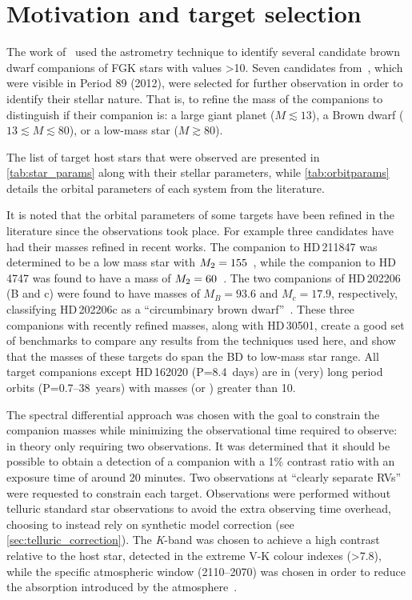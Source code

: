 
\section{Motivation and target selection}
\label{sec:target_motivation}

The work of~\citet{sahlmann_search_2011} used the astrometry technique to identify several candidate brown dwarf companions of {FGK} stars with \Mtwosini{} values >10\Mjup{}.
Seven candidates from~\citet{sahlmann_search_2011}, which were visible in {Period 89} (2012), were selected for further observation in order to identify their stellar nature.
That is, to refine the mass of the companions to distinguish if their companion is: a large giant planet (\(M \apprle 13\)\Mjup{}), a Brown dwarf (\(13 \apprle M \apprle 80\)\Mjup{}), or a low-mass star (\(M \apprge 80\)\Mjup).

The list of target host stars that were observed are presented in \cref{tab:star_params} along with their stellar parameters, while \cref{tab:orbitparams} details the orbital parameters of each system from the literature.

It is noted that the orbital parameters of some targets have been refined in the literature since the observations took place.
For example three candidates have had their masses refined in recent works.
The companion to {HD\,211847} was determined to be a low mass star with \({M}_{2}=155\)\Mjup{}~\citep{moutou_eccentricity_2017}, while the companion to {HD\,4747} was found to have a mass of \({M}_{2}=60\)\Mjup{}~\citep{crepp_trends_2016}.
The two companions of {HD\,202206} (B and c) were found to have masses of \({M}_{B}=93.6\)\Mjup{} and \({M}_{c}=17.9\)\Mjup{}, respectively, classifying {HD\,202206}c as a ``circumbinary brown dwarf''~\citep{benedict_hd_2017}.
These three companions with recently refined masses, along with {HD\,30501}, create a good set of benchmarks to compare any results from the techniques used here, and show that the masses of these targets do span the {BD} to low-mass star range.
All target companions except {HD\,162020} (P=8.4~days) are in (very) long period orbits (P=0.7--38~years) with masses (or \Mtwosini{}) greater than 10\Mjup{}.

The spectral differential approach was chosen with the goal to constrain the companion masses while minimizing the observational time required to observe: in theory only requiring two observations.
It was determined that it should be possible to obtain a detection of a companion with a 1\% contrast ratio with an exposure time of around 20 minutes.
Two observations at ``clearly separate {RV}s'' were requested to constrain each target.
Observations were performed without telluric standard star observations to avoid the extra observing time overhead, choosing to instead rely on synthetic model correction (see \cref{sec:telluric_correction}).
The \textit{K}-band was chosen to achieve a high contrast relative to the host star, detected in the extreme V-K colour indexes (>7.8), while the specific atmospheric window (2110--2070\nm{}) was chosen in order to reduce the absorption introduced by the atmosphere~\citep{barnes_hd_2008}.

\begin{landscape}
    
    
\end{landscape}
